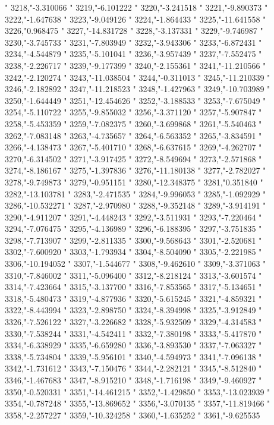 "
3218,"-3.310066
"
3219,"-6.101222
"
3220,"-3.241518
"
3221,"-9.890373
"
3222,"-1.647638
"
3223,"-9.049126
"
3224,"-1.864433
"
3225,"-11.641558
"
3226,"0.968475
"
3227,"-14.831728
"
3228,"-3.137331
"
3229,"-9.746987
"
3230,"-3.745733
"
3231,"-7.803949
"
3232,"-3.943306
"
3233,"-6.872431
"
3234,"-4.544879
"
3235,"-5.101041
"
3236,"-3.957439
"
3237,"-7.552475
"
3238,"-2.226717
"
3239,"-9.177399
"
3240,"-2.155361
"
3241,"-11.210566
"
3242,"-2.120274
"
3243,"-11.038504
"
3244,"-0.311013
"
3245,"-11.210339
"
3246,"-2.182892
"
3247,"-11.218523
"
3248,"-1.427963
"
3249,"-10.703989
"
3250,"-1.644449
"
3251,"-12.454626
"
3252,"-3.188533
"
3253,"-7.675049
"
3254,"-5.110722
"
3255,"-9.855032
"
3256,"-3.371120
"
3257,"-5.907847
"
3258,"-5.453359
"
3259,"-7.082375
"
3260,"-3.699868
"
3261,"-5.540463
"
3262,"-7.083148
"
3263,"-4.735657
"
3264,"-6.563352
"
3265,"-3.834591
"
3266,"-4.138473
"
3267,"-5.401710
"
3268,"-6.637615
"
3269,"-4.262707
"
3270,"-6.314502
"
3271,"-3.917425
"
3272,"-8.549694
"
3273,"-2.571868
"
3274,"-8.186167
"
3275,"-1.397836
"
3276,"-11.180138
"
3277,"-2.782027
"
3278,"-9.749873
"
3279,"-0.951151
"
3280,"-12.348375
"
3281,"0.351840
"
3282,"-13.103781
"
3283,"-2.471535
"
3284,"-9.996053
"
3285,"-1.092929
"
3286,"-10.532271
"
3287,"-2.970980
"
3288,"-9.352148
"
3289,"-3.914191
"
3290,"-4.911207
"
3291,"-4.448243
"
3292,"-3.511931
"
3293,"-7.220464
"
3294,"-7.076475
"
3295,"-4.136989
"
3296,"-6.188395
"
3297,"-3.751835
"
3298,"-7.713907
"
3299,"-2.811335
"
3300,"-9.568643
"
3301,"-2.520681
"
3302,"-7.600920
"
3303,"-1.793934
"
3304,"-8.504090
"
3305,"-2.221985
"
3306,"-10.194052
"
3307,"-1.544677
"
3308,"-9.462610
"
3309,"-3.371063
"
3310,"-7.846002
"
3311,"-5.096400
"
3312,"-8.218124
"
3313,"-3.601574
"
3314,"-7.423664
"
3315,"-3.137700
"
3316,"-7.853565
"
3317,"-5.134651
"
3318,"-5.480473
"
3319,"-4.877936
"
3320,"-5.615245
"
3321,"-4.859321
"
3322,"-8.443994
"
3323,"-2.898750
"
3324,"-8.394998
"
3325,"-3.912849
"
3326,"-7.526122
"
3327,"-3.226682
"
3328,"-5.932509
"
3329,"-4.314583
"
3330,"-7.538244
"
3331,"-4.542411
"
3332,"-7.380198
"
3333,"-5.417870
"
3334,"-6.338929
"
3335,"-6.659280
"
3336,"-3.893530
"
3337,"-7.063327
"
3338,"-5.734804
"
3339,"-5.956101
"
3340,"-4.594973
"
3341,"-7.096138
"
3342,"-1.731612
"
3343,"-7.150476
"
3344,"-2.282121
"
3345,"-8.512840
"
3346,"-1.467683
"
3347,"-8.915210
"
3348,"-1.716198
"
3349,"-9.460927
"
3350,"-0.520331
"
3351,"-14.461215
"
3352,"-1.429850
"
3353,"-13.023939
"
3354,"-0.787248
"
3355,"-13.869652
"
3356,"-3.070135
"
3357,"-11.819466
"
3358,"-2.257227
"
3359,"-10.324258
"
3360,"-1.635252
"
3361,"-9.625535
